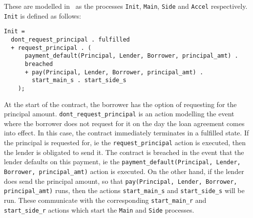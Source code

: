 \documentclass{article}
\begin{document}

These are modelled in \mcrl \, as the processes
\texttt{Init}, \texttt{Main}, \texttt{Side} and \texttt{Accel} respectively.
\texttt{Init} is defined as follows:





\begin{verbatim}
Init =
  dont_request_principal . fulfilled
  + request_principal . (
      payment_default(Principal, Lender, Borrower, principal_amt) .
      breached
      + pay(Principal, Lender, Borrower, principal_amt) .
        start_main_s . start_side_s
    );
\end{verbatim}

At the start of the contract, the borrower has the option of requesting for
the principal amount.
\texttt{dont\_request\_principal} is an action modelling the event where the
borrower does not request for it on the day the loan agreement comes into
effect.
In this case, the contract immediately terminates in a fulfilled state.
If the principal is requested for, ie the \texttt{request\_principal} action
is executed, then the lender is obligated to send it.
The contract is breached in the event that the lender defaults on this payment,
ie the \texttt{payment\_default(Principal, Lender, Borrower, principal\_amt)}
action is executed.
On the other hand, if the lender does send the principal amount,
so that \texttt{pay(Principal, Lender, Borrower, principal\_amt)} runs,
then the actions \texttt{start\_main\_s} and \texttt{start\_side\_s} will be run.
These communicate with the corresponding \texttt{start\_main\_r} and
\texttt{start\_side\_r} actions which start the \texttt{Main} and
\texttt{Side} processes.
\end{document}
